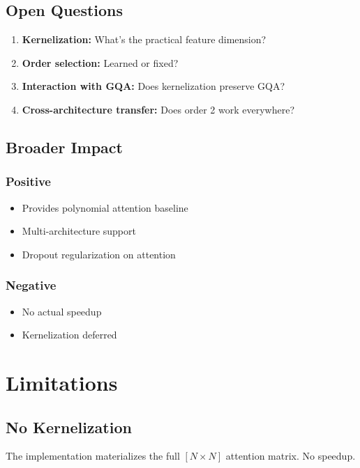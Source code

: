 \subsection{Open Questions}

\begin{enumerate}
\item \textbf{Kernelization:} What's the practical feature dimension?
\item \textbf{Order selection:} Learned or fixed?
\item \textbf{Interaction with GQA:} Does kernelization preserve GQA?
\item \textbf{Cross-architecture transfer:} Does order 2 work everywhere?

\end{enumerate}
\subsection{Broader Impact}

\subsubsection{Positive}
\begin{itemize}
\item Provides polynomial attention baseline
\item Multi-architecture support
\item Dropout regularization on attention

\end{itemize}
\subsubsection{Negative}
\begin{itemize}
\item No actual speedup
\item Kernelization deferred

\end{itemize}


\section{Limitations}

\subsection{No Kernelization}

The implementation materializes the full $[N \times N]$ attention matrix. 
No speedup.


